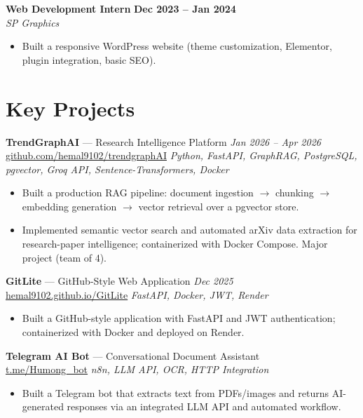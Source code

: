 \documentclass[a4paper,8pt]{extarticle}
\newcommand{\expitem}[4]{%
  \textbf{#1} \hfill \textbf{#3}\\
  \textit{#2} \hfill \textit{#4}\\
}
\begin{document}
\expitem{Web Development Intern}{SP Graphics}{Dec 2023 -- Jan 2024}{}
\begin{itemize}
  \item Built a responsive WordPress website (theme customization, Elementor, plugin integration, basic SEO).
\end{itemize}

\section{Key Projects}

\textbf{TrendGraphAI} --- Research Intelligence Platform \hfill \textit{Jan 2026 -- Apr 2026}\\
\href{https://github.com/hemal9102/trendgraphAI}{github.com/hemal9102/trendgraphAI}
\textit{\quad Python, FastAPI, GraphRAG, PostgreSQL, pgvector, Groq API, Sentence-Transformers, Docker}
\begin{itemize}
  \item Built a production RAG pipeline: document ingestion $\rightarrow$ chunking
        $\rightarrow$ embedding generation $\rightarrow$ vector retrieval over a
        pgvector store.
  \item Implemented semantic vector search and automated arXiv data extraction for
        research-paper intelligence; containerized with Docker Compose. Major project (team of 4).
\end{itemize}

\textbf{GitLite} --- GitHub-Style Web Application \hfill \textit{Dec 2025}\\
\href{https://hemal9102.github.io/GitLite/}{hemal9102.github.io/GitLite}
\textit{\quad FastAPI, Docker, JWT, Render}
\begin{itemize}
  \item Built a GitHub-style application with FastAPI and JWT authentication;
        containerized with Docker and deployed on Render.
\end{itemize}

\textbf{Telegram AI Bot} --- Conversational Document Assistant\\
\href{https://t.me/Humong_bot}{t.me/Humong\_bot}
\textit{\quad n8n, LLM API, OCR, HTTP Integration}
\begin{itemize}
  \item Built a Telegram bot that extracts text from PDFs/images and returns
        AI-generated responses via an integrated LLM API and automated workflow.
\end{itemize}
\end{document}
